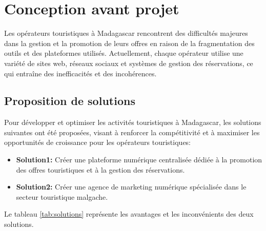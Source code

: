 \documentclass[12pt]{report}
\begin{document}
				\section{Conception avant projet}
				
				\hspace{15pt} Les opérateurs touristiques à Madagascar rencontrent des difficultés majeures dans la gestion et la promotion de leurs offres en raison de la fragmentation des outils et des plateformes utilisés. Actuellement, chaque opérateur utilise une variété de sites web, réseaux sociaux et systèmes de gestion des réservations, ce qui entraîne des inefficacités et des incohérences.

				\subsection{Proposition de solutions}

				\hspace{15pt} Pour développer et optimiser les activités touristiques à Madagascar, les solutions suivantes ont été proposées, visant à renforcer la compétitivité et à maximiser les opportunités de croissance pour les opérateurs touristiques:

				\begin{itemize}
					\item \textbf{Solution1:} Créer une plateforme numérique centralisée dédiée à la promotion des offres touristiques et à la gestion des réservations.
					\item \textbf{Solution2:} Créer une agence de marketing numérique spécialisée dans le secteur touristique malgache.
				\end{itemize}

				Le tableau \ref{tab:solutions} représente les avantages et les inconvénients des deux solutions.
\end{document}
